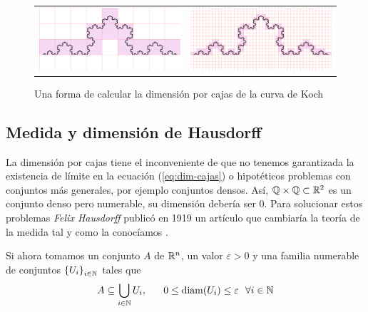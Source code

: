 \begin{figure}[h]
\begin{tabular}{cc}
\includegraphics[scale=0.17]{./img/cajas-grandes.png} &   \includegraphics[scale=0.17]{./img/cajas-peques.png} \\
\end{tabular}
\caption{Una forma de calcular la dimensión por cajas de la curva de Koch}
\label{fig:dim-cajas}
\end{figure}

\subsection{Medida y dimensión de Hausdorff}
\label{subsection:dim-Hausdorff}

La dimensión por cajas tiene el inconveniente de que no tenemos garantizada la existencia de límite en la ecuación (\ref{eq:dim-cajas}) o hipotéticos problemas con conjuntos más generales, por ejemplo conjuntos densos. Así, $\mathbb{Q}\times\mathbb{Q}\subset\mathbb{R}^2$ es un conjunto denso pero numerable, su dimensión debería ser 0. Para solucionar estos problemas \textit{Felix Hausdorff} publicó en 1919 un artículo que cambiaría la teoría de la medida tal y como la conocíamos \cite{Hausdorff1919}. 


Si ahora tomamos un conjunto $A$ de $\mathbb{R}^n$, un valor $\varepsilon>0$ y una familia numerable de conjuntos $\left\lbrace U_i\right\rbrace_{i\in\mathbb{N}}$  tales que 
$$
A\subseteq\bigcup_{i\in\N} U_i, \ \ \ \ \ 0\leq\diam(U_i)\leq\varepsilon \ \ \forall i\in \N
$$

